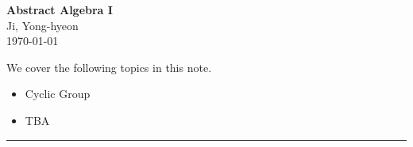 \documentclass[11pt,openany]{article}
\begin{document}
\begin{center}
	\huge\textbf{Abstract Algebra I}\\
	\vspace{0.5em}
	\large{Ji, Yong-hyeon}\\
	\vspace{0.5em}
	\normalsize{\today}\\
\end{center}

\noindent 
We cover the following topics in this note.
\begin{itemize}
	\item Cyclic Group
	\item TBA
\end{itemize}
\hrule\vspace{12pt}
\newpage

\end{document}
